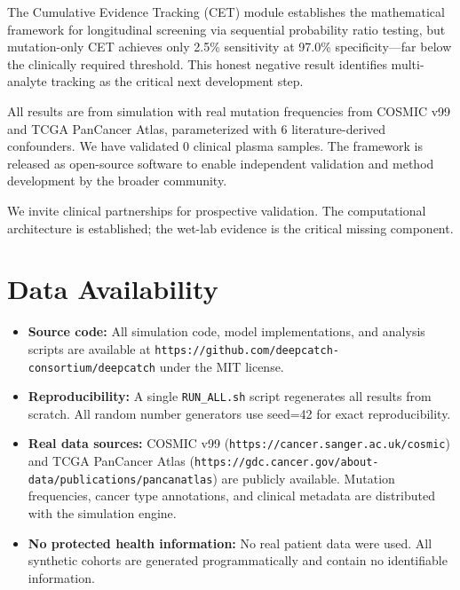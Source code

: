 \documentclass[10pt,a4paper]{article}
\begin{document}
The Cumulative Evidence Tracking (CET) module establishes the mathematical framework for longitudinal screening via sequential probability ratio testing, but mutation-only CET achieves only 2.5\% sensitivity at 97.0\% specificity—far below the clinically required threshold. This honest negative result identifies multi-analyte tracking as the critical next development step.

All results are from simulation with real mutation frequencies from COSMIC v99 and TCGA PanCancer Atlas, parameterized with 6 literature-derived confounders. We have validated 0 clinical plasma samples. The framework is released as open-source software to enable independent validation and method development by the broader community.

We invite clinical partnerships for prospective validation. The computational architecture is established; the wet-lab evidence is the critical missing component.


\section{Data Availability}

\begin{itemize}[nosep]
\item \textbf{Source code:} All simulation code, model implementations, and analysis scripts are available at \texttt{https://github.com/deepcatch-consortium/deepcatch} under the MIT license.

\item \textbf{Reproducibility:} A single \texttt{RUN\_ALL.sh} script regenerates all results from scratch. All random number generators use seed=42 for exact reproducibility.

\item \textbf{Real data sources:} COSMIC v99 (\texttt{https://cancer.sanger.ac.uk/cosmic}) and TCGA PanCancer Atlas (\texttt{https://gdc.cancer.gov/about-data/publications/pancanatlas}) are publicly available. Mutation frequencies, cancer type annotations, and clinical metadata are distributed with the simulation engine.

\item \textbf{No protected health information:} No real patient data were used. All synthetic cohorts are generated programmatically and contain no identifiable information.
\end{itemize}




\end{document}
